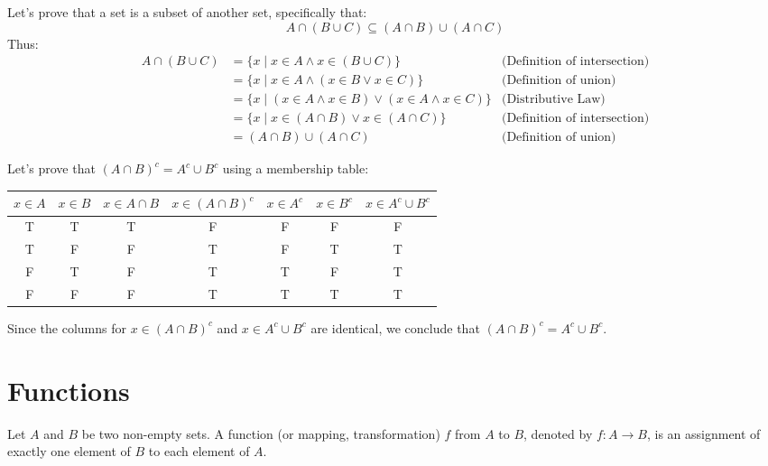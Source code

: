 \begin{eg}
    Let's prove that a set is a subset of another set, specifically that:
    \[ A \cap (B \cup C) \subseteq (A \cap B) \cup (A \cap C) \]
    Thus:
    \begin{align*}
        A \cap (B \cup C) &= \{x \mid x \in A \land x \in (B \cup C)\} &\text{(Definition of intersection)}\\
        &= \{x \mid x \in A \land (x \in B \lor x \in C)\} &\text{(Definition of union)}\\
        &= \{x \mid (x \in A \land x \in B) \lor (x \in A \land x \in C)\} &\text{(Distributive Law)}\\
        &= \{x \mid x \in (A \cap B) \lor x \in (A \cap C)\} &\text{(Definition of intersection)}\\
        &= (A \cap B) \cup (A \cap C) &\text{(Definition of union)}
    \end{align*}
\end{eg}

\begin{eg}
    Let's prove that $(A \cap B)^c = A^c \cup B^c$ using a membership table:
    \begin{center}
        \begin{tabular}{c|c|c|c|c|c|c}
            $x \in A$ & $x \in B$ & $x \in A \cap B$ & $x \in (A \cap B)^c$ & $x \in A^c$ & $x \in B^c$ & $x \in A^c \cup B^c$\\
            \hline
            T & T & T & F & F & F & F\\
            T & F & F & T & F & T & T\\
            F & T & F & T & T & F & T\\
            F & F & F & T & T & T & T\\
        \end{tabular}
    \end{center}
    Since the columns for $x \in (A \cap B)^c$ and $x \in A^c \cup B^c$ are identical, we conclude that $(A \cap B)^c = A^c \cup B^c$.
\end{eg}

\section{Functions}
\begin{definition}[Function]
    Let $A$ and $B$ be two non-empty sets. A function (or mapping, transformation) $f$ from $A$ to $B$, denoted by $f: A \to B$, is an assignment of exactly one element of $B$ to each element of $A$.
\end{definition}

